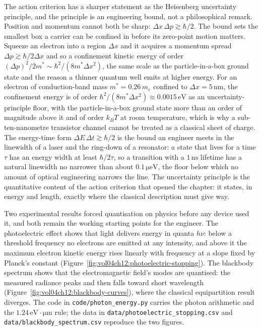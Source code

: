 \begin{mastery}
The action criterion has a sharper statement as the Heisenberg
uncertainty principle, and the principle is an engineering bound, not a
philosophical remark. Position and momentum cannot both be sharp:
$\Delta x\,\Delta p \gtrsim \hbar/2$. The bound sets the smallest box a
carrier can be confined in before its zero-point motion matters. Squeeze
an electron into a region $\Delta x$ and it acquires a momentum spread
$\Delta p \gtrsim \hbar/2\Delta x$ and so a confinement kinetic energy of
order $(\Delta p)^{2}/2m^{*} \sim \hbar^{2}/(8m^{*}\Delta x^{2})$, the
same scale as the particle-in-a-box ground state and the reason a thinner
quantum well emits at higher energy. For an electron of conduction-band
mass $m^{*} = 0.26\,m_e$ confined to $\Delta x = 5\,\si{\nano\meter}$, the
confinement energy is of order $\hbar^{2}/(8m^{*}\Delta x^{2}) \approx
0.0015\,\si{\electronvolt}$ as an uncertainty-principle floor, with the
particle-in-a-box ground state more than an order of magnitude above it and
of order $k_B T$ at room temperature, which is why a sub-ten-nanometre
transistor channel cannot be treated as a classical sheet of charge. The energy-time form $\Delta E\,\Delta t \gtrsim \hbar/2$
is the bound an engineer meets in the linewidth of a laser and the
ring-down of a resonator: a state that lives for a time $\tau$ has an
energy width at least $\hbar/2\tau$, so a transition with a $1\,\si{\nano
\second}$ lifetime has a natural linewidth no narrower than about
$0.1\,\si{\micro\electronvolt}$, the floor below which no amount of optical
engineering narrows the line. The uncertainty principle is the quantitative
content of the action criterion that opened the chapter: it states, in
energy and length, exactly where the classical description must give way.
\end{mastery}

Two experimental results forced quantisation on physics before any
device used it, and both remain the working starting points for the
engineer. The photoelectric effect shows that light delivers energy in
quanta $h\nu$: below a threshold frequency no electrons are emitted at
any intensity, and above it the maximum electron kinetic energy rises
linearly with frequency at a slope fixed by Planck's constant
(Figure~\ref{fig:vol04ch12:photoelectric-stopping}). The blackbody
spectrum shows that the electromagnetic field's modes are quantised:
the measured radiance peaks and then falls toward short wavelength
(Figure~\ref{fig:vol04ch12:blackbody-curves}), where the classical
equipartition result diverges. The code in
\texttt{code/photon\_energy.py} carries the photon arithmetic and the
$1.24\,\text{eV}\cdot\si{\micro\meter}$ rule; the data in
\texttt{data/photoelectric\_stopping.csv} and
\texttt{data/blackbody\_spectrum.csv} reproduce the two figures.

